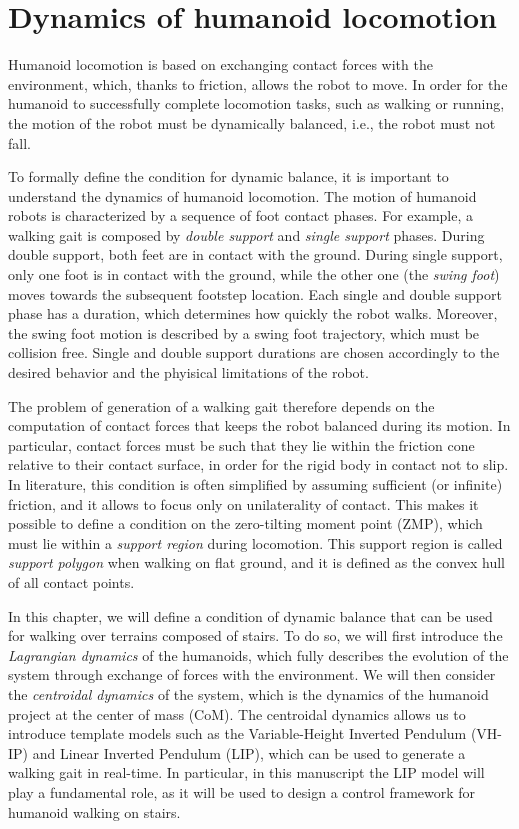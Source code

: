 \chapter{Dynamics of humanoid locomotion}
\label{ch:humanoid-locomotion-dynamics}
Humanoid locomotion is based on exchanging contact forces with the environment,
which, thanks to friction, allows the robot to move. In order for the humanoid to
successfully complete locomotion tasks, such as walking or running, the motion
of the robot must be dynamically balanced, i.e., the robot must not fall.

To formally define the condition for dynamic balance, it is important
to understand the dynamics of humanoid locomotion. The motion of humanoid robots
is characterized by a sequence of foot contact phases. For example, a walking
gait is composed by \textit{double support} and \textit{single support} phases. During
double support, both feet are in contact with the ground. During single support,
only one foot is in contact with the ground, while the other one (the \textit{swing foot})
moves towards the subsequent footstep location. Each single and double support
phase has a duration, which determines how quickly the robot walks. Moreover,
the swing foot motion is described by a swing foot trajectory, which must be
collision free. Single and double support durations are chosen accordingly to 
the desired behavior and the phyisical limitations of the robot.

The problem of generation of a walking gait therefore depends on the
computation of contact forces that keeps the robot balanced during its motion.
In particular, contact forces must be such that they lie within the friction cone
relative to their contact surface, in order for the rigid body in contact not to slip. 
In literature, this condition is often simplified by assuming sufficient (or
infinite) friction, and it allows to focus only on unilaterality of contact.
This makes it possible to define a condition on the zero-tilting moment point
(ZMP), which must lie within a \textit{support region} during locomotion. This
support region is called \textit{support polygon} when walking on flat ground,
and it is defined as the convex hull of all contact points.

In this chapter, we will define a condition of dynamic balance that can be
used for walking over terrains composed of stairs. To do so, we will first introduce the 
\textit{Lagrangian dynamics} of the humanoids, which fully describes the evolution
of the system through exchange of forces with the environment. We will then 
consider the \textit{centroidal dynamics} of the system, which is the 
dynamics of the humanoid project at the center of mass (CoM). The centroidal
dynamics allows us to introduce template models such as the Variable-Height
Inverted Pendulum (VH-IP) and Linear Inverted Pendulum (LIP), which can be used to generate
a walking gait in real-time. In particular, in this manuscript the LIP model
will play a fundamental role, as it will be used to design a control framework
for humanoid walking on stairs.

